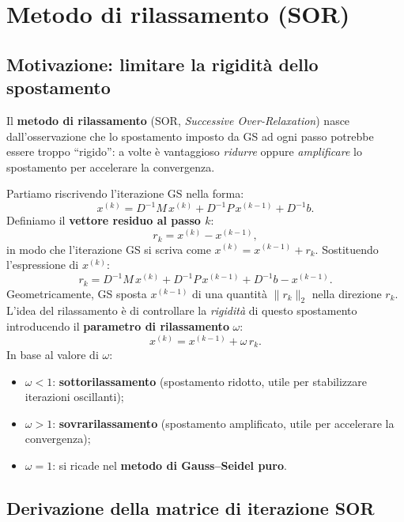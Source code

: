 \documentclass[a4paper,12pt]{article}
\theoremstyle{definition}
\theoremstyle{remark}
\begin{document}
\section{Metodo di rilassamento (SOR)}

\subsection{Motivazione: limitare la rigidità dello spostamento}

Il \textbf{metodo di rilassamento} (SOR, \emph{Successive Over-Relaxation})
nasce dall'osservazione che lo spostamento imposto da GS ad ogni passo
potrebbe essere troppo ``rigido'': a volte è vantaggioso \emph{ridurre}
oppure \emph{amplificare} lo spostamento per accelerare la convergenza.

Partiamo riscrivendo l'iterazione GS nella forma:
\[
  x^{(k)} = D^{-1}M\,x^{(k)} + D^{-1}P\,x^{(k-1)} + D^{-1}b.
\]
Definiamo il \textbf{vettore residuo al passo $k$}:
\[
  r_k = x^{(k)} - x^{(k-1)},
\]
in modo che l'iterazione GS si scriva come $x^{(k)} = x^{(k-1)} + r_k$.
Sostituendo l'espressione di $x^{(k)}$:
\[
  r_k
  = D^{-1}M\,x^{(k)} + D^{-1}P\,x^{(k-1)} + D^{-1}b - x^{(k-1)}.
\]
Geometricamente, GS sposta $x^{(k-1)}$ di una quantità $\|r_k\|_2$
nella direzione $r_k$.
L'idea del rilassamento è di controllare la \emph{rigidità} di questo
spostamento introducendo il \textbf{parametro di rilassamento} $\omega$:
\[
  \boxed{x^{(k)} = x^{(k-1)} + \omega\,r_k.}
\]
In base al valore di $\omega$:
\begin{itemize}
  \item $\omega < 1$: \textbf{sottorilassamento} (spostamento ridotto,
        utile per stabilizzare iterazioni oscillanti);
  \item $\omega > 1$: \textbf{sovrarilassamento} (spostamento amplificato,
        utile per accelerare la convergenza);
  \item $\omega = 1$: si ricade nel \textbf{metodo di Gauss--Seidel puro}.
\end{itemize}

\subsection{Derivazione della matrice di iterazione SOR}
\end{document}
